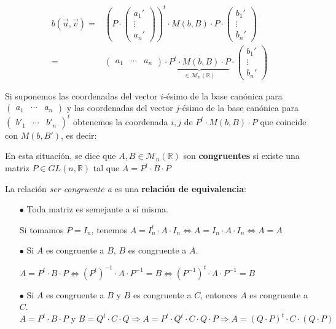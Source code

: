\documentclass[x11names,table]{report}
\begin{document}
\[
\begin{split}
b(\vec{u},\vec{v})=&\left(P\cdot\begin{pmatrix}
a_1'\\ \vdots \\ a_n'
\end{pmatrix}\right)^t \cdot M(b,B)\cdot P\cdot\begin{pmatrix}
b_1'\\ \vdots \\ b_n'
\end{pmatrix}\\
=&\begin{pmatrix}
a_1 & \cdots & a_n
\end{pmatrix}\cdot\underbrace{P^t \cdot M(b,B)\cdot P}_{\in\mathcal{M}_n(\mathbb{R})}\cdot\begin{pmatrix}
b_1'\\ \vdots \\ b_n'
\end{pmatrix}
\end{split}
\]

Si suponemos las coordenadas del vector $i$-ésimo de la base canónica para $\begin{pmatrix}a_1 & \cdots & a_n\end{pmatrix}$ y las coordenadas del vector $j$-ésimo de la base canónica para $\begin{pmatrix}b'_1 & \cdots & b'_n\end{pmatrix}^t$ obtenemos la coordenada $i,j$ de $P^t\cdot M(b,B)\cdot P$ que coincide con $M(b,B')$, es decir:
\begin{center}
\end{center}
En esta situación, se dice que $A,B\in\mathcal{M}_n(\mathbb{R})$ son \textbf{congruentes} si existe una matriz $P\in GL(n,\mathbb{R})$ tal que $A=P^t\cdot B\cdot P$

La relación \textit{ser congruente a} es una \textbf{relación de equivalencia}:
\begin{itemize}
\item[$\bullet$] Toda matriz es semejante a sí misma.

Si tomamos $P=I_n$, tenemos $A=I_n^t\cdot A\cdot I_n\Leftrightarrow A=I_n\cdot A\cdot I_n\Leftrightarrow A=A$
\item[$\bullet$] Si $A$ es congruente a $B$, $B$ es congruente a $A$.

$A=P^t\cdot B\cdot P\Leftrightarrow (P^t)^{-1}\cdot A\cdot P^{-1}=B\Leftrightarrow (P^{-1})^t\cdot A\cdot P^{-1}=B$
\item[$\bullet$] Si $A$ es congruente a $B$ y $B$ es congruente a $C$, entonces $A$ es congruente a $C$.
\[
A=P^t\cdot B\cdot P\text{ y } B=Q^t\cdot C\cdot Q\Rightarrow A=P^t\cdot Q^t\cdot C\cdot Q\cdot P \Rightarrow A=(Q\cdot P)^t \cdot C\cdot (Q\cdot P)
\]
\end{itemize}
\end{document}
